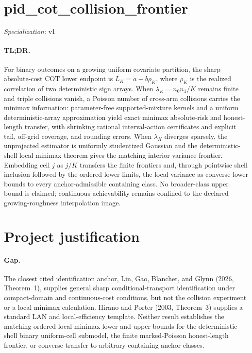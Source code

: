 \documentclass{article}
\begin{document}
\sloppy

\section*{pid\_\allowbreak{}cot\_\allowbreak{}collision\_\allowbreak{}frontier}

\noindent\textit{Specialization:} v1\par

\paragraph{TL;DR.} For binary outcomes on a growing uniform covariate partition, the sharp absolute-cost COT lower endpoint is \(L_K=a-b\rho_K\), where \(\rho_K\) is the realized correlation of two deterministic sign arrays. When \(\lambda_K=n_0n_1/K\) remains finite and triple collisions vanish, a Poisson number of cross-arm collisions carries the minimax information: parameter-free supported-mixture kernels and a uniform deterministic-array approximation yield exact minimax absolute-risk and honest-length transfer, with shrinking rational interval-action certificates and explicit tail, off-grid coverage, and rounding errors. When \(\lambda_K\) diverges sparsely, the unprojected estimator is uniformly studentized Gaussian and the deterministic-shell local minimax theorem gives the matching interior variance frontier. Embedding cell \(j\) as \(j/K\) transfers the finite frontiers and, through pointwise shell inclusion followed by the ordered lower limits, the local variance as converse lower bounds to every anchor-admissible containing class. No broader-class upper bound is claimed; continuous achievability remains confined to the declared growing-roughness interpolation image.

\section{Project justification}

\paragraph{Gap.} The closest cited identification anchor, Lin, Gao, Blanchet, and Glynn (2026, Theorem~1), supplies general sharp conditional-transport identification under compact-domain and continuous-cost conditions, but not the collision experiment or a local minimax calculation. Hirano and Porter (2003, Theorem~3) supplies a standard LAN and local-efficiency template. Neither result establishes the matching ordered local-minimax lower and upper bounds for the deterministic-shell binary uniform-cell submodel, the finite marked-Poisson honest-length frontier, or converse transfer to arbitrary containing anchor classes.
\end{document}

